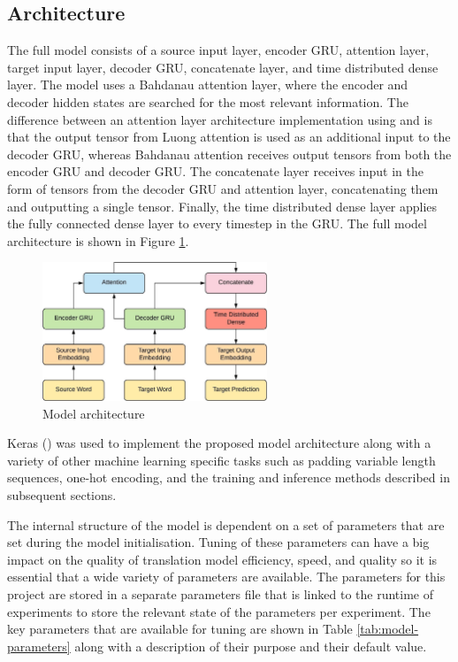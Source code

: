 \subsection{Architecture}
The full model consists of a source input layer, encoder \acrshort{GRU}, attention layer, target input layer, decoder \acrshort{GRU}, concatenate layer, and time distributed dense layer.
The model uses a Bahdanau attention layer, where the encoder and decoder hidden states are searched for the most relevant information. The difference between an attention layer architecture implementation using \cite{bahdanau_neural_2016} and \cite{luong_effective_2015} is that the output tensor from Luong attention is used as an additional input to the decoder \acrshort{GRU}, whereas Bahdanau attention receives output tensors from both the encoder \acrshort{GRU} and decoder \acrshort{GRU}.
The concatenate layer receives input in the form of tensors from the decoder \acrshort{GRU} and attention layer, concatenating them and outputting a single tensor. Finally, the time distributed dense layer applies the fully connected dense layer to every timestep in the \acrshort{GRU}. The full model architecture is shown in Figure \ref{fig:model_diagram}.



\begin{figure}[ht!]
\centering
\includegraphics[width=0.6\textwidth]{media/methodology/model_architecture.jpeg}
\captionsetup{justification=centering,font=Large}
\caption[Diagram of the model architecture]{Model architecture}
\label{fig:model_diagram}
\end{figure}

Keras (\cite{keras_2015}) was used to implement the proposed model architecture along with a variety of other machine learning specific tasks such as padding variable length sequences, one-hot encoding, and the training and inference methods described in subsequent sections.


The internal structure of the model is dependent on a set of parameters that are set during the model initialisation. 
Tuning of these parameters can have a big impact on the quality of translation model efficiency, speed, and quality so it is essential that a wide variety of parameters are available. The parameters for this project are stored in a separate parameters file that is linked to the runtime of experiments to store the relevant state of the parameters per experiment. The key parameters that are available for tuning are shown in Table \ref{tab:model-parameters} along with a description of their purpose and their default value.

